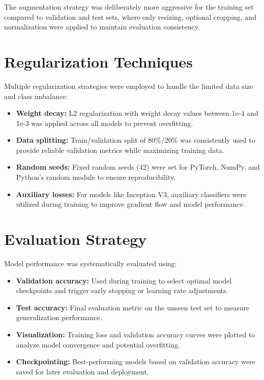 \documentclass[a4paper,12pt]{article}
\begin{document}
The augmentation strategy was deliberately more aggressive for the training set compared to validation and test sets, where only resizing, optional cropping, and normalization were applied to maintain evaluation consistency.



\section{Regularization Techniques}

Multiple regularization strategies were employed to handle the limited data size and class imbalance:

\begin{itemize}
    \item \textbf{Weight decay:} L2 regularization with weight decay values between 1e-4 and 1e-3 was applied across all models to prevent overfitting.
    \item \textbf{Data splitting:} Train/validation split of 80\%/20\% was consistently used to provide reliable validation metrics while maximizing training data.
    \item \textbf{Random seeds:} Fixed random seeds (42) were set for PyTorch, NumPy, and Python's random module to ensure reproducibility.
    \item \textbf{Auxiliary losses:} For models like Inception V3, auxiliary classifiers were utilized during training to improve gradient flow and model performance.
\end{itemize}

\section{Evaluation Strategy}

Model performance was systematically evaluated using:

\begin{itemize}
    \item \textbf{Validation accuracy:} Used during training to select optimal model checkpoints and trigger early stopping or learning rate adjustments.
    \item \textbf{Test accuracy:} Final evaluation metric on the unseen test set to measure generalization performance.
    \item \textbf{Visualization:} Training loss and validation accuracy curves were plotted to analyze model convergence and potential overfitting.
    \item \textbf{Checkpointing:} Best-performing models based on validation accuracy were saved for later evaluation and deployment.
\end{itemize}
\end{document}
